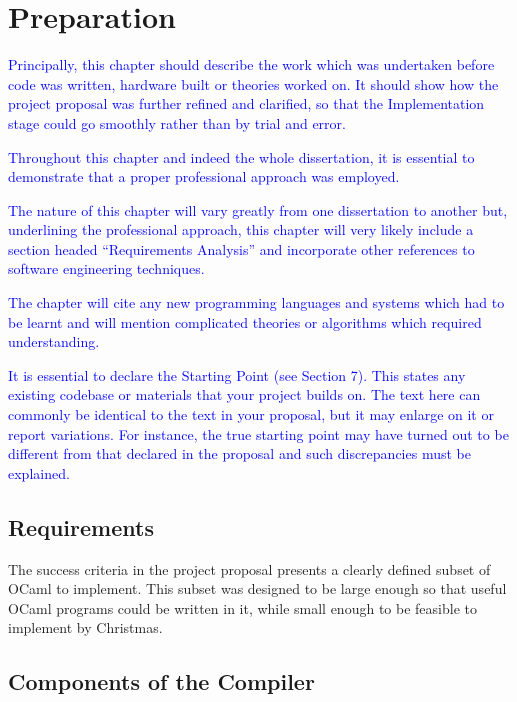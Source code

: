 \documentclass[12pt,twoside,notitlepage]{report}
\newcommand\note[1]{\textcolor{blue}{#1}}
\begin{document}
\clearpage



\chapter{Preparation}
\note{Principally, this chapter should describe the work which was undertaken before code was written, hardware built or theories worked on. It should show how the project proposal was further refined and clarified, so that the Implementation stage could go smoothly rather than by trial and error.}

\note{Throughout this chapter and indeed the whole dissertation, it is essential to demonstrate that a proper professional approach was employed.}

\note{The nature of this chapter will vary greatly from one dissertation to another but, underlining the professional approach, this chapter will very likely include a section headed “Requirements Analysis” and incorporate other references to software engineering techniques.}

\note{The chapter will cite any new programming languages and systems which had to be learnt and will mention complicated theories or algorithms which required understanding.}

\note{It is essential to declare the Starting Point (see Section 7). This states any existing codebase or materials that your project builds on. The text here can commonly be identical to the text in your proposal, but it may enlarge on it or report variations. For instance, the true starting point may have turned out to be different from that declared in the proposal and such discrepancies must be explained. }

\section{Requirements}

The success criteria in the project proposal presents a clearly defined subset of OCaml to implement. This subset was designed to be large enough so that useful OCaml programs could be written in it, while small enough to be feasible to implement by Christmas.




\section{Components of the Compiler}
\end{document}
